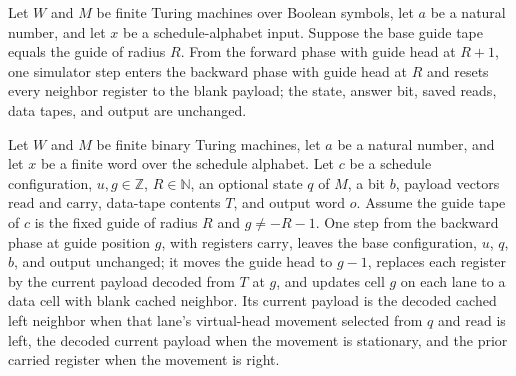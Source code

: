 \begin{lemma}
\label{Complexity.dataCfg_forward_turn}
\leanok
{}
Let $W$ and $M$ be finite Turing machines over Boolean symbols, let $a$ be a natural
number, and let $x$ be a schedule-alphabet input. Suppose the base guide tape equals the
guide of radius $R$. From the forward phase with guide head at $R+1$, one simulator step
enters the backward phase with guide head at $R$ and resets every neighbor register to
the blank payload; the state, answer bit, saved reads, data tapes, and output are
unchanged.
\end{lemma}

\begin{lemma}
\label{Complexity.dataCfg_backward_step}
\leanok
{}
Let $W$ and $M$ be finite binary Turing machines, let $a$ be a natural number, and let
$x$ be a finite word over the schedule alphabet. Let $c$ be a schedule configuration,
$u,g\in\mathbb{Z}$, $R\in\mathbb{N}$, an optional state $q$ of $M$, a bit $b$, payload
vectors $\mathrm{read}$ and $\mathrm{carry}$, data-tape contents $T$, and output word
$o$. Assume the guide tape of $c$ is the fixed guide of radius $R$ and $g\ne -R-1$. One
step from the backward phase at guide position $g$, with registers $\mathrm{carry}$,
leaves the base configuration, $u$, $q$, $b$, and output unchanged; it moves the guide
head to $g-1$, replaces each register by the current payload decoded from $T$ at $g$,
and updates cell $g$ on each lane to a data cell with blank cached neighbor. Its current
payload is the decoded cached left neighbor when that lane's virtual-head movement
selected from $q$ and $\mathrm{read}$ is left, the decoded current payload when the
movement is stationary, and the prior carried register when the movement is right.
\end{lemma}


